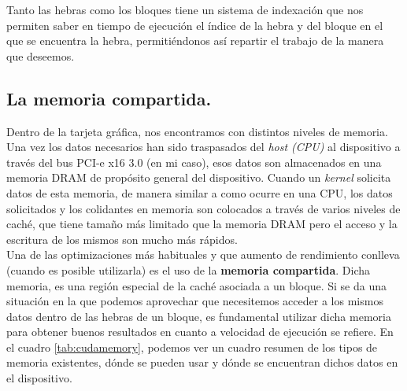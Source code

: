 Tanto las hebras como los bloques tiene un sistema de indexación que nos permiten saber en tiempo de ejecución el índice de la hebra y del bloque en el que se encuentra la hebra, permitiéndonos así repartir el trabajo de la manera que deseemos.

\subsection{La memoria compartida.}
Dentro de la tarjeta gráfica, nos encontramos con distintos niveles de memoria. Una vez los datos necesarios han sido traspasados del \textit{host (CPU)} al dispositivo a través del bus PCI-e x16 3.0 (en mi caso), esos datos son almacenados en una memoria DRAM de propósito general del dispositivo. Cuando un \textit{kernel} solicita datos de esta memoria, de manera similar a como ocurre en una CPU, los datos solicitados y los colidantes en memoria son colocados a través de varios niveles de caché, que tiene tamaño más limitado que la memoria DRAM pero el acceso y la escritura de los mismos son mucho más rápidos.\\

Una de las optimizaciones más habituales y que aumento de rendimiento conlleva (cuando es posible utilizarla) es el uso de la \textbf{memoria compartida}. Dicha memoria, es una región especial de la caché asociada a un bloque. Si se da una situación en la que podemos aprovechar que necesitemos acceder a los mismos datos dentro de las hebras de un bloque, es fundamental utilizar dicha memoria para obtener buenos resultados en cuanto a velocidad de ejecución se refiere. En el cuadro \ref{tab:cudamemory}, podemos ver un cuadro resumen de los tipos de memoria existentes, dónde se pueden usar y dónde se encuentran dichos datos en el dispositivo.

